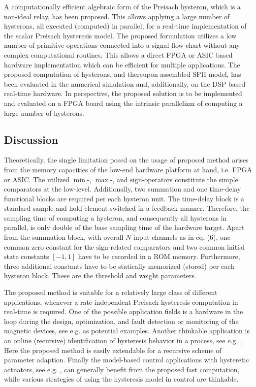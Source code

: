 \documentclass[journal]{IEEEtran}
\begin{document}
A computationally efficient algebraic form of the Preisach
hysteron, which is a non-ideal relay, has been proposed. This
allows applying a large number of hysterons, all executed
(computed) in parallel, for a real-time implementation of the
scalar Preisach hysteresis model. The proposed formulation
utilizes a low number of primitive operations connected into a
signal flow chart without any complex computational routines. This
allows a direct FPGA or ASIC based hardware implementation which
can be efficient for multiple applications. The proposed
computation of hysterons, and thereupon assembled SPH model, has
been evaluated in the numerical simulation and, additionally, on
the DSP based real-time hardware. In perspective, the proposed
solution is to be implemented and evaluated on a FPGA board using
the intrinsic parallelizm of computing a large number of
hysterons.

\subsection{Discussion}

Theoretically, the single limitation posed on the usage of
proposed method arises from the memory capacities of the low-end
hardware platform at hand, i.e. FPGA or ASIC. The utilized
$\min$-, $\max$-, and $\mathrm{sign}$-operators constitute the
simple comparators at the low-level. Additionally, two summation
and one time-delay functional blocks are required per each
hysteron unit. The time-delay block is a standard sample-and-hold
element switched in a feedback manner. Therefore, the sampling
time of computing a hysteron, and consequently all hysterons in
parallel, is only double of the base sampling time of the hardware
target. Apart from the summation block, with overall $N$ input
channels as in eq. (6), one common zero constant for the
$\mathrm{sign}$-related comparators and two common initial state
constants $[-1,1]$ have to be recorded in a ROM memory.
Furthermore, three additional constants have to be statically
memorized (stored) per each hysteron block. These are the
threshold and weight parameters.

The proposed method is suitable for a relatively large class of
different applications, whenever a rate-independent Preisach
hysteresis computation in real-time is required. One of the
possible application fields is a hardware in the loop during the
design, optimization, and fault detection or monitoring of the
magnetic devices, see e.g. \cite{RosenEtAl10,ruderman2013b} as
potential examples. Another thinkable application is an online
(recursive) identification of hysteresis behavior in a process,
see e.g. \cite{ruder2015}. Here the proposed method is easily
extendable for a recursive scheme of parameter adaption. Finally
the model-based control applications with hysteretic actuators,
see e.g.
\cite{davino2005,Janocha2008,iyer2009,esbrook2013,ruderman2014},
can generally benefit from the proposed fast computation, while
various strategies of using the hysteresis model in control are
thinkable.





\ifCLASSOPTIONcaptionsoff
  \newpage
\fi


















\end{document}
